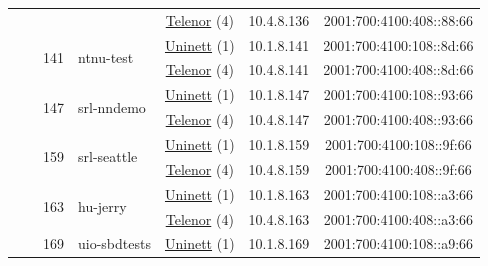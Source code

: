 \begin{small}
\begin{center}
\begin{longtable}{|c|c|c|c|c|c|c|c|}
  &  &  &  & \multicolumn{2}{|c|}{\tiny{\href{https://www.telenor.no}{Telenor} (4)}} & \tiny{10.4.8.136} & \tiny{2001:700:4100:408::88:66} \\* \cline{3-3}\cline{4-4}\cline{5-5}\cline{6-6}\cline{7-7}\cline{8-8}
  &  & \multirow{2}{*}{\tiny{141}} & \multicolumn{1}{|l|}{\multirow{2}{*}{\tiny{ntnu-test}}} & \multicolumn{2}{|c|}{\tiny{\href{https://www.uninett.no}{Uninett} (1)}} & \tiny{10.1.8.141} & \tiny{2001:700:4100:108::8d:66} \\* \cline{5-5}\cline{6-6}\cline{7-7}\cline{8-8}
  &  &  &  & \multicolumn{2}{|c|}{\tiny{\href{https://www.telenor.no}{Telenor} (4)}} & \tiny{10.4.8.141} & \tiny{2001:700:4100:408::8d:66} \\* \cline{3-3}\cline{4-4}\cline{5-5}\cline{6-6}\cline{7-7}\cline{8-8}
  &  & \multirow{2}{*}{\tiny{147}} & \multicolumn{1}{|l|}{\multirow{2}{*}{\tiny{srl-nndemo}}} & \multicolumn{2}{|c|}{\tiny{\href{https://www.uninett.no}{Uninett} (1)}} & \tiny{10.1.8.147} & \tiny{2001:700:4100:108::93:66} \\* \cline{5-5}\cline{6-6}\cline{7-7}\cline{8-8}
  &  &  &  & \multicolumn{2}{|c|}{\tiny{\href{https://www.telenor.no}{Telenor} (4)}} & \tiny{10.4.8.147} & \tiny{2001:700:4100:408::93:66} \\* \cline{3-3}\cline{4-4}\cline{5-5}\cline{6-6}\cline{7-7}\cline{8-8}
  &  & \multirow{2}{*}{\tiny{159}} & \multicolumn{1}{|l|}{\multirow{2}{*}{\tiny{srl-seattle}}} & \multicolumn{2}{|c|}{\tiny{\href{https://www.uninett.no}{Uninett} (1)}} & \tiny{10.1.8.159} & \tiny{2001:700:4100:108::9f:66} \\* \cline{5-5}\cline{6-6}\cline{7-7}\cline{8-8}
  &  &  &  & \multicolumn{2}{|c|}{\tiny{\href{https://www.telenor.no}{Telenor} (4)}} & \tiny{10.4.8.159} & \tiny{2001:700:4100:408::9f:66} \\* \cline{3-3}\cline{4-4}\cline{5-5}\cline{6-6}\cline{7-7}\cline{8-8}
  &  & \multirow{2}{*}{\tiny{163}} & \multicolumn{1}{|l|}{\multirow{2}{*}{\tiny{hu-jerry}}} & \multicolumn{2}{|c|}{\tiny{\href{https://www.uninett.no}{Uninett} (1)}} & \tiny{10.1.8.163} & \tiny{2001:700:4100:108::a3:66} \\* \cline{5-5}\cline{6-6}\cline{7-7}\cline{8-8}
  &  &  &  & \multicolumn{2}{|c|}{\tiny{\href{https://www.telenor.no}{Telenor} (4)}} & \tiny{10.4.8.163} & \tiny{2001:700:4100:408::a3:66} \\* \cline{3-3}\cline{4-4}\cline{5-5}\cline{6-6}\cline{7-7}\cline{8-8}
  &  & \multirow{2}{*}{\tiny{169}} & \multicolumn{1}{|l|}{\multirow{2}{*}{\tiny{uio-sbdtests}}} & \multicolumn{2}{|c|}{\tiny{\href{https://www.uninett.no}{Uninett} (1)}} & \tiny{10.1.8.169} & \tiny{2001:700:4100:108::a9:66} \\* \cline{5-5}\cline{6-6}\cline{7-7}\cline{8-8}

\end{longtable}
\end{center}
\end{small}
